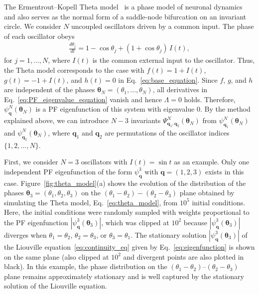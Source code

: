\documentclass[
amsmath,amssymb,
]{revtex4-2}
\begin{document}
The Ermentrout--Kopell Theta model~\cite{ermentrout1986parabolic,ermentrout2008ekmodel} is a phase model of neuronal dynamics and also serves as the normal form of a saddle-node bifurcation on an invariant circle. %
We consider $N$ uncoupled oscillators driven by a common input.
The phase of each oscillator obeys
%
\begin{align}
    \label{eq:theta_model}
    \frac{d\theta_j}{dt} = 1 - \cos \theta_j + (1 + \cos \theta_j)\, I(t),
\end{align}
%
for $j=1, ..., N$, where $I(t)$ is the common external input to the oscillator. 
%
Thus, the Theta model corresponds to the case with $f(t) = 1 + I(t)$, $g(t) = -1 + I(t)$, and $h(t) = 0$ in Eq.~\eqref{eq:base_equation}. 
%
Since $f$, $g$, and $h$ are independent of the phases ${\bm \theta}_N = (\theta_1, \ldots, \theta_N)$, all derivatives in Eq.~\eqref{eq:PF_eigenvalue_equation} vanish and hence $\Lambda = 0$ holds.
%
Therefore, $\psi^N_{\bm{q}}({\bm \theta}_N)$ is a PF eigenfunction of this system with eigenvalue $0$. 
%
By the method explained above, we can introduce $N-3$ invariants $\Psi^N_{\bm{q}_1,\bm{q}_2}({\bm \theta}_N)$ from $\psi^N_{\bm{q}_1}({\bm \theta}_N)$ and $\psi^N_{\bm{q}_2}({\bm \theta}_N)$, where $\bm{q}_1$ and $\bm{q}_2$ are permutations of the oscillator indices $\{ 1, 2, ..., N\}$.

%
First, we consider $N=3$ oscillators with $I(t) = \sin t$ as an example. Only one independent PF eigenfunction of the form $\psi^3_{\bm q}$ with ${\bm q} = (1, 2, 3)$ exists in this case.
%
Figure~\ref{fig:theta_model}(a) shows the evolution of the distribution of the phases ${\bm \theta}_3 = (\theta_1, \theta_2, \theta_3)$ on the $(\theta_1-\theta_2) - (\theta_2-\theta_3)$ plane obtained by simulating the Theta model, Eq.~\eqref{eq:theta_model}, from $10^5$ initial conditions. 
%
Here, the initial conditions were randomly sampled with weights proportional to the PF eigenfunction $\left|\psi^3_{\bm{q}}({\bm \theta}_3)\right|$, which was clipped at $10^2$ because $\left|\psi^3_{\bm{q}}({\bm \theta}_3)\right|$ diverges when $\theta_1 = \theta_2$, $\theta_2 = \theta_3$, or $\theta_3 = \theta_1$.
%
The stationary solution $\left|\psi^3_{\bm{q}}({\bm \theta}_3)\right|$ of the Liouville equation~\eqref{eq:continuity_eq} given by Eq.~\eqref{eq:eigenfunction} is shown on the same plane (also clipped at $10^2$ and divergent points are also plotted in black). 
%
In this example, the phase distribution on the $(\theta_1-\theta_2)$--$(\theta_2-\theta_3)$ plane remains approximately stationary and is well captured by the stationary solution of the Liouville equation.
%
\end{document}
